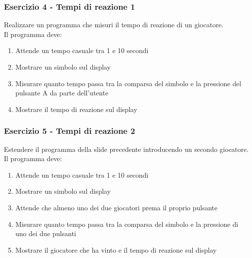 \documentclass{beamer}
\begin{document}
\begin{frame}
	\frametitle{Esercizio 4 - Tempi di reazione 1}
	Realizzare un programma che misuri il tempo di reazione di un giocatore.\\
	Il programma deve:
	\begin{enumerate}
		\item Attende un tempo casuale tra 1 e 10 secondi
		\item Mostrare un simbolo sul display
		\item Misurare quanto tempo passa tra la comparsa del simbolo e la pressione del pulsante A da parte dell'utente
		\item Mostrare il tempo di reazione sul display
	\end{enumerate}	
\end{frame}
\begin{frame}
	\frametitle{Esercizio 5 - Tempi di reazione 2}
	Estendere il programma della slide precedente introducendo un secondo giocatore.\\
	Il programma deve:
	\begin{enumerate}
		\item Attende un tempo casuale tra 1 e 10 secondi
		\item Mostrare un simbolo sul display
		\item Attende che almeno uno dei due giocatori prema il proprio pulsante
		\item Misurare quanto tempo passa tra la comparsa del simbolo e la pressione di uno dei due pulsanti
		\item Mostrare il giocatore che ha vinto e il tempo di reazione sul display
	\end{enumerate}	
\end{frame}
\end{document}
